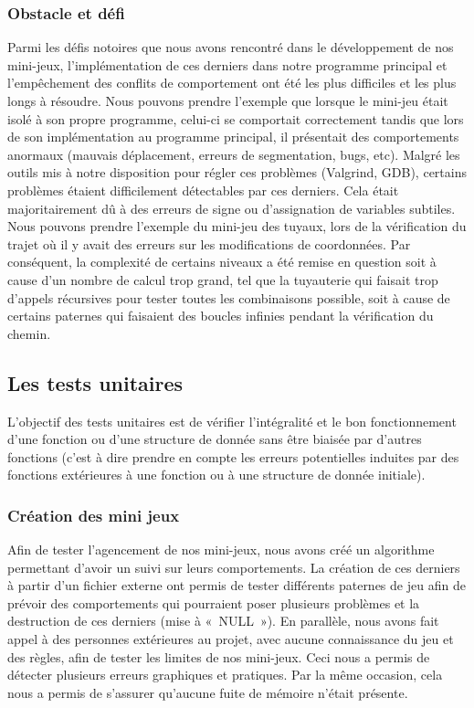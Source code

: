 \documentclass[12pt,a4paper]{article}
\begin{document}
            \subsubsection{Obstacle et défi}
                \tabto{1cm} Parmi les défis notoires que nous avons rencontré dans le développement de nos mini-jeux, l’implémentation de ces derniers dans notre programme principal et l'empêchement des conflits de comportement ont été les plus difficiles et les plus longs à résoudre. Nous pouvons prendre l'exemple que lorsque le mini-jeu était isolé à son propre programme, celui-ci se comportait correctement tandis que lors de son implémentation au programme principal, il présentait des comportements anormaux (mauvais déplacement, erreurs de segmentation, bugs, etc). Malgré les outils mis à notre disposition pour régler ces problèmes (Valgrind, GDB), certains problèmes étaient difficilement détectables par ces derniers. Cela était majoritairement dû à des erreurs de signe ou d’assignation de variables subtiles. Nous pouvons prendre l'exemple du mini-jeu des tuyaux, lors de la vérification du trajet où il y avait des erreurs sur les modifications de coordonnées. Par conséquent, la complexité de certains niveaux a été remise en question soit à cause d’un nombre de calcul trop grand, tel que la tuyauterie qui faisait trop d’appels récursives pour tester toutes les combinaisons possible, soit à cause de certains paternes qui faisaient des boucles infinies pendant la vérification du chemin.
            
         \subsection{Les tests unitaires}
            \tabto{1cm} L’objectif des tests unitaires est de vérifier l’intégralité et le bon fonctionnement d’une fonction ou d’une structure de donnée sans être biaisée par d’autres fonctions (c’est à dire prendre en compte les erreurs potentielles induites par des fonctions extérieures à une fonction ou à une structure de donnée initiale).

            \subsubsection{Création des mini jeux}
                \tabto{1cm} Afin de tester l’agencement de nos mini-jeux, nous avons créé un algorithme permettant d’avoir un suivi sur leurs comportements. La création de ces derniers à partir d’un fichier externe ont permis de tester différents paternes de jeu afin de prévoir des comportements qui pourraient poser plusieurs problèmes et la destruction de ces derniers (mise à «~NULL~»). En parallèle, nous avons fait appel à des personnes extérieures au projet, avec aucune connaissance du jeu et des règles, afin de tester les limites de nos mini-jeux. Ceci nous a permis de détecter plusieurs erreurs graphiques et pratiques. Par la même occasion, cela nous a permis de s’assurer qu’aucune fuite de mémoire n’était présente.
            
\end{document}
